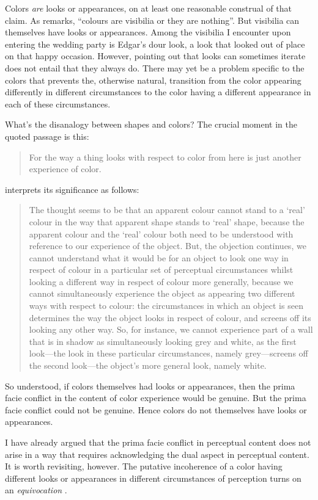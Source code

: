 \documentclass[12pt]{article}
\begin{document}
Colors \emph{are} looks or appearances, on at least one reasonable construal of that claim. As \citet[109]{Strawson:1966kx} remarks, ``colours are visibilia or they are nothing''. But visibilia can themselves have looks or appearances. Among the visibilia I encounter upon entering the wedding party is Edgar's dour look, a look that looked out of place on that happy occasion. However, pointing out that looks can sometimes iterate does not entail that they always do. There may yet be a problem specific to the colors that prevents the, otherwise natural, transition from the color appearing differently in different circumstances to the color having a different appearance in each of these circumstances.

What's the disanalogy between shapes and colors? The crucial moment in the quoted passage is this:
	\begin{quote}
		For the way a thing looks with respect to color from here is just another experience of color. \citep[133]{Noe:2004fk}
	\end{quote}
\citet{Allen:2008kx} interprets its significance as follows:
	\begin{quote}
		The thought seems to be that an apparent colour cannot stand to a ‘real’ colour in the way that apparent shape stands to ‘real’ shape, because the apparent colour and the ‘real’ colour both need to be understood with reference to our experience of the object. But, the objection continues, we cannot understand what it would be for an object to look one way in respect of colour in a particular set of perceptual circumstances whilst looking a different way in respect of colour more generally, because we cannot simultaneously experience the object as appearing two different ways with respect to colour: the circumstances in which an object is seen determines the way the object looks in respect of colour, and screens off its looking any other way. So, for instance, we cannot experience part of a wall that is in shadow as simultaneously looking grey and white, as the first look---the look in these particular circumstances, namely grey---screens off the second look---the object’s more general look, namely white.
	\end{quote}
So understood, if colors themselves had looks or appearances, then the prima facie conflict in the content of color experience would be genuine. But the prima facie conflict could not be genuine. Hence colors do not themselves have looks or appearances.

I have already argued that the prima facie conflict in perceptual content does not arise in a way that requires acknowledging the dual aspect in perceptual content. It is worth revisiting, however. The putative incoherence of a color having different looks or appearances in different circumstances of perception turns on an \emph{equivocation} \citep[though I develop the point in a different way, it is essentially due to][48]{Chisholm:1957dq}. 
\end{document}
